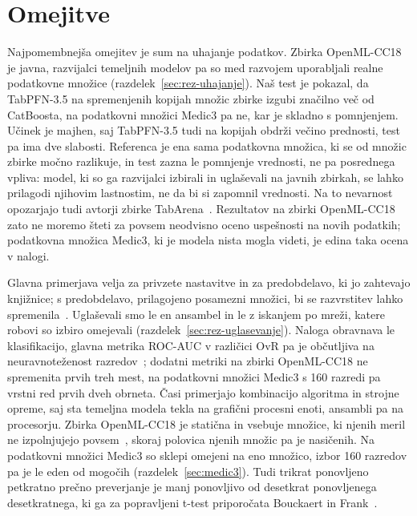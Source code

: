 \documentclass[a4paper,12pt,openright]{book}
\begin{document}
\section{Omejitve}
\label{sec:omejitve}

Najpomembnejša omejitev je sum na uhajanje podatkov. Zbirka OpenML-CC18 je
javna, razvijalci temeljnih modelov pa so med razvojem uporabljali realne
podatkovne množice (razdelek~\ref{sec:rez-uhajanje}). Naš test je pokazal, da
TabPFN-3.5 na spremenjenih kopijah množic zbirke izgubi značilno več od
CatBoosta, na podatkovni množici Medic3 pa ne, kar je skladno s pomnjenjem.
Učinek je majhen, saj TabPFN-3.5 tudi na kopijah obdrži večino prednosti, test
pa ima dve slabosti. Referenca je ena sama podatkovna množica, ki se od množic
zbirke močno razlikuje, in test zazna le pomnjenje vrednosti, ne pa posrednega
vpliva: model, ki so ga razvijalci izbirali in uglaševali na javnih zbirkah, se
lahko prilagodi njihovim lastnostim, ne da bi si zapomnil vrednosti. Na to
nevarnost opozarjajo tudi avtorji zbirke TabArena~\cite{erickson2025tabarena}.
Rezultatov na zbirki OpenML-CC18 zato ne moremo šteti za povsem neodvisno oceno
uspešnosti na novih podatkih; podatkovna množica Medic3, ki je modela nista
mogla videti, je edina taka ocena v nalogi.

Glavna primerjava velja za privzete nastavitve in za predobdelavo, ki jo
zahtevajo knjižnice; s predobdelavo, prilagojeno posamezni množici, bi se
razvrstitev lahko spremenila~\cite{tschalzev2024data}. Uglaševali smo le en
ansambel in le z iskanjem po mreži, katere robovi so izbiro omejevali
(razdelek~\ref{sec:rez-uglasevanje}). Naloga obravnava le klasifikacijo,
glavna metrika ROC-AUC v različici OvR pa je občutljiva na neuravnoteženost
razredov~\cite{sklearndocsroc}; dodatni metriki na zbirki OpenML-CC18 ne
spremenita prvih treh mest, na podatkovni množici Medic3 s 160 razredi pa
vrstni red prvih dveh obrneta. Časi primerjajo
kombinacijo algoritma in strojne opreme, saj sta temeljna modela tekla na
grafični procesni enoti, ansambli pa na procesorju. Zbirka OpenML-CC18 je
statična in vsebuje množice, ki njenih meril ne izpolnjujejo
povsem~\cite{bischl2021openml}, skoraj polovica njenih množic pa je nasičenih.
Na podatkovni množici Medic3 so sklepi omejeni na eno množico, izbor 160
razredov pa je le eden od mogočih (razdelek~\ref{sec:medic3}). Tudi trikrat
ponovljeno petkratno prečno preverjanje je manj ponovljivo od desetkrat
ponovljenega desetkratnega, ki ga za popravljeni t-test priporočata Bouckaert
in Frank~\cite{bouckaert2004evaluating}.
\end{document}
